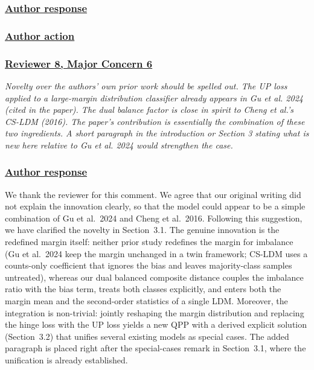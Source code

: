 \documentclass[journal,12pt, onecolumn]{IEEEtran}
\begin{document}
{\color{black}
\subsubsection*{\textbf{\underline{Author response}}}
}


{\color{black}
\subsubsection*{\textbf{\underline{Author action}}}
}


{\color{customgreen}
\subsubsection*{\underline{\textbf{Reviewer 8, Major Concern 6}}}
\emph{Novelty over the authors' own prior work should be spelled out. The UP loss applied to a large-margin distribution classifier already appears in Gu et al. 2024 (cited in the paper). The dual balance factor is close in spirit to Cheng et al.'s CS-LDM (2016). The paper's contribution is essentially the combination of these two ingredients. A short paragraph in the introduction or Section 3 stating what is new here relative to Gu et al. 2024 would strengthen the case.}
}


{\color{black}
\subsubsection*{\textbf{\underline{Author response}}}
We thank the reviewer for this comment. We agree that our original writing did not explain the innovation clearly, so that the model could appear to be a simple combination of Gu et al.~2024 and Cheng et al.~2016. Following this suggestion, we have clarified the novelty in Section~3.1. The genuine innovation is the redefined margin itself: neither prior study redefines the margin for imbalance (Gu et al.~2024 keep the margin unchanged in a twin framework; CS-LDM uses a counts-only coefficient that ignores the bias and leaves majority-class samples untreated), whereas our dual balanced composite distance couples the imbalance ratio with the bias term, treats both classes explicitly, and enters both the margin mean and the second-order statistics of a single LDM. Moreover, the integration is non-trivial: jointly reshaping the margin distribution and replacing the hinge loss with the UP loss yields a new QPP with a derived explicit solution (Section~3.2) that unifies several existing models as special cases. The added paragraph is placed right after the special-cases remark in Section~3.1, where the unification is already established.
}
\end{document}
